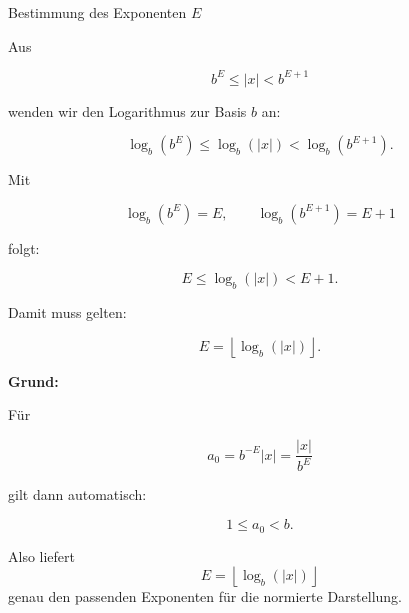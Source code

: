 \documentclass{beamer}
\begin{document}
\begin{frame}{Bestimmung des Exponenten \(E\)}

Aus

\[
b^E \leq |x| < b^{E+1}
\]

wenden wir den Logarithmus zur Basis \(b\) an:

\[
\log_b(b^E) \leq \log_b(|x|) < \log_b(b^{E+1}).
\]

Mit

\[
\log_b(b^E)=E,
\qquad
\log_b(b^{E+1})=E+1
\]

folgt:

\[
E \leq \log_b(|x|) < E+1.
\]

\vspace{0.4cm}

Damit muss gelten:

\[
E=\left\lfloor \log_b(|x|)\right\rfloor.
\]

\vspace{0.5cm}

\textbf{Grund:}

Für

\[
a_0=b^{-E}|x|=\frac{|x|}{b^E}
\]

gilt dann automatisch:

\[
1 \leq a_0 < b.
\]

Also liefert
\[
E=\left\lfloor \log_b(|x|)\right\rfloor
\]
genau den passenden Exponenten für die normierte Darstellung.

\end{frame}

\end{document}
